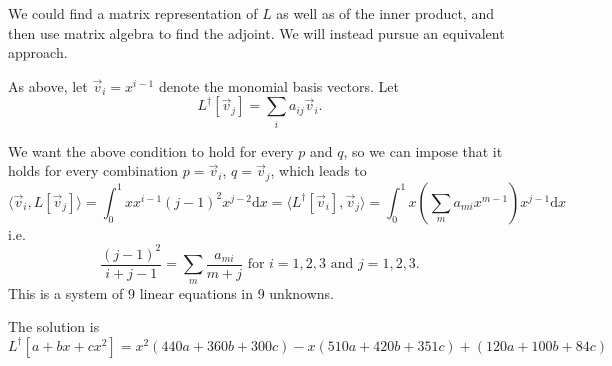 \documentclass[11pt,fleqn]{article}
\begin{document}
\begin{enumerate}
We could find a matrix representation of $L$ as well as of the inner product, and then use matrix algebra to find the adjoint. We will instead pursue an equivalent approach.

As above, let $\vec{v}_i = x^{i-1}$ denote the monomial basis vectors.
Let
\[L^\dag[\vec{v}_j] = \sum_{i}a_{ij}\vec{v}_i.\]

We want the above condition to hold for every $p$ and $q$, so we can impose that it holds for every combination $p = \vec{v}_i$, $q=\vec{v}_j$, which leads to
\[\langle \vec{v}_i,L[\vec{v}_j]\rangle = \int_0^1 x x^{i-1} (j-1)^2x^{j-2}\mathrm{d}x=\langle L^\dag[\vec{v}_i],\vec{v}_j\rangle = \int_0^1 x (\sum_{m}a_{mi}x^{m-1})x^{j-1} \mathrm{d}x\]
i.e.
\[\frac{(j-1)^2}{i+j-1} = \sum_m\frac{a_{mi}}{m+j}\text{ for }i=1,2,3\text{ and }j=1,2,3.\]
This is a system of 9 linear equations in 9 unknowns.

The solution is
\[L^\dag[a+bx+cx^2] = x^2 (440 a+360 b+300 c)-x (510 a+420 b+351 c)+(120 a+100 b+84 c)\]

\end{enumerate}
 
\end{document}
